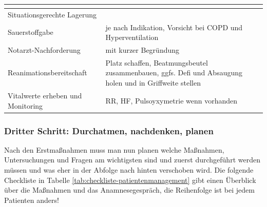 \begin{center}

\begin{tabulary}{\linewidth}{LL}
\toprule
{}
\\\midrule
Situationsgerechte Lagerung
 &
\\\addlinespace
Sauerstoffgabe
 &
je nach Indikation, Vorsicht bei COPD und Hyper\-ventilation
\\\addlinespace
Notarzt{}-Nachforderung
 &
mit kurzer Begründung
\\\addlinespace
Reanimationsbereitschaft
 &
Platz schaffen, Beatmungsbeutel zu\-sammen\-bauen, ggfs. Defi und
Absaugung holen und in Griffweite stellen
\\\addlinespace
Vitalwerte erheben und Monitoring
 &
RR, HF, Pulsoyxymetrie wenn vor\-handen
\\\bottomrule
\end{tabulary}
\end{center}

\subsubsection{Dritter Schritt: Durchatmen, nachdenken,
planen}

Nach den Erstmaßnahmen muss man nun planen welche Maßnahmen,
Untersuchungen und Fragen am wichtigsten sind und zuerst durchgeführt
werden müssen und was eher in der Abfolge nach hinten ver\-schoben
wird. Die folgende Checkliste in Tabelle
\ref{tab:checkliste-patientenmanagement} gibt einen
Überblick über die Maßnahmen und das Anamnese\-ge\-spr\"ach, die Reihenfolge ist bei jedem Patienten anders!


